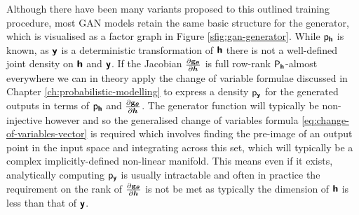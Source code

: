 Although there have been many variants proposed to this outlined training procedure, most \ac{GAN} models retain the same basic structure for the generator, which is visualised as a factor graph in Figure \ref{sfig:gan-generator}. While $\mathsf{p}_{\boldsymbol{\mathsf{h}}}$ is known, as $\boldsymbol{\mathsf{y}}$ is a deterministic transformation of $\boldsymbol{\mathsf{h}}$ there is not a well-defined joint density on $\boldsymbol{\mathsf{h}}$ and $\boldsymbol{\mathsf{y}}$. If the Jacobian $\frac{\partial {\mathbf{g}}_{\boldsymbol{\theta}}}{\partial \boldsymbol{h}}$ is full row-rank $\mathsf{P}_{\boldsymbol{\mathsf{h}}}$-almost everywhere we can in theory apply the change of variable formulae discussed in Chapter \ref{ch:probabilistic-modelling} to express a density $\mathsf{p}_{\boldsymbol{\mathsf{y}}}$ for the generated outputs in terms of $\mathsf{p}_{\boldsymbol{\mathsf{h}}}$ and $\frac{\partial {\mathbf{g}}_{\boldsymbol{\theta}}}{\partial \boldsymbol{h}}$. The generator function will typically be non-injective however and so the generalised change of variables formula \eqref{eq:change-of-variables-vector} is required which involves finding the pre-image of an output point in the input space and integrating across this set, which will typically be a complex implicitly-defined non-linear manifold. This means even if it exists, analytically computing $\mathsf{p}_{\boldsymbol{\mathsf{y}}}$ is usually intractable and often in practice the requirement on the rank of $\frac{\partial {\mathbf{g}}_{\boldsymbol{\theta}}}{\partial \boldsymbol{h}}$ is not be met as typically the dimension of $\boldsymbol{\mathsf{h}}$ is less than that of $\boldsymbol{\mathsf{y}}$.




